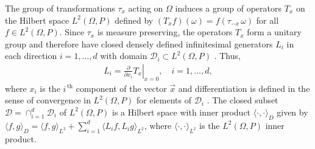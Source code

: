 \documentclass{cmslatex}
\begin{document}
The group of transformations $\tau_x$ acting on $\Omega$ induces a group of
operators $T_x$ on the Hilbert space $L^2(\Omega,P)$ defined by
$(T_xf)(\omega)=f(\tau_{-x}\,\omega)$ for all $f\in L^2(\Omega,P)$. Since $\tau_x$ is measure
preserving, the operators $T_x$ form a unitary group and therefore
have closed densely defined infinitesimal generators $L_i$ in each
direction $i=1,\ldots,d$ with domain $\mathscr{D}_i\subset L^2(\Omega,P)$
\cite{Golden:CMP-473,Papanicolaou:RF-835}. Thus,  
%
\begin{align*}
  L_i=\left.\frac{\partial}{\partial x_i}T_x \right|_{x=0}, \quad i=1,\ldots,d,
\end{align*}
%
where $x_i$
is the $i^{\,\text{th}}$ component of the vector
$\vec{x}$ and differentiation is defined in the sense of convergence
in $L^2(\Omega,P)$ for elements of $\mathscr{D}_i$
\cite{Golden:CMP-473}. The closed subset
$\mathscr{D}=\cap_{i=1}^d\mathscr{D}_i$ of $L^2(\Omega,P)$ is a Hilbert space
\cite{Golden:CMP-473} with inner product $\langle \cdot,\cdot\rangle_D$ given by  $\langle
f,g\rangle_D=\langle f,g\rangle_{L^2}+\sum_{i=1}^d\langle L_if,L_ig\rangle_{L^2}$, where $\langle\cdot,\cdot\rangle_{L^2}$
is the $L^2(\Omega,P)$ inner product. 
\end{document}
